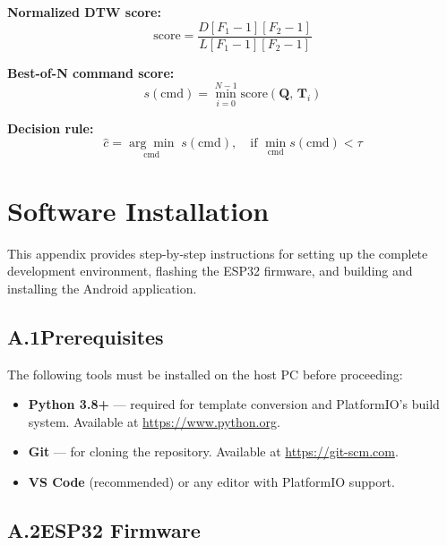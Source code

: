\documentclass[conference]{IEEEtran}
\begin{document}
\textbf{Normalized DTW score:}
\begin{equation}
  \text{score} = \frac{D[F_1{-}1][F_2{-}1]}{L[F_1{-}1][F_2{-}1]}
  \label{eq:dtwnorm}
\end{equation}

\textbf{Best-of-N command score:}
\begin{equation}
  s(\text{cmd}) = \min_{i=0}^{N-1} \text{score}(\mathbf{Q},\,\mathbf{T}_i)
  \label{eq:bestofn}
\end{equation}

\textbf{Decision rule:}
\begin{equation}
  \hat{c} = \underset{\text{cmd}}{\arg\min}\; s(\text{cmd}),
  \quad \text{if } \min_{\text{cmd}} s(\text{cmd}) < \tau
  \label{eq:decision}
\end{equation}
\appendix
\section{Software Installation}
\label{app:install}

This appendix provides step-by-step instructions for setting up the
complete development environment, flashing the ESP32 firmware, and
building and installing the Android application.

\subsection*{A.1\quad Prerequisites}

The following tools must be installed on the host PC before proceeding:

\begin{itemize}
  \item \textbf{Python 3.8+} — required for template conversion and
    PlatformIO's build system. Available at \url{https://www.python.org}.
  \item \textbf{Git} — for cloning the repository.
    Available at \url{https://git-scm.com}.
  \item \textbf{VS Code} (recommended) or any editor with PlatformIO support.
\end{itemize}

\subsection*{A.2\quad ESP32 Firmware} \label{app:esp32}
\end{document}
